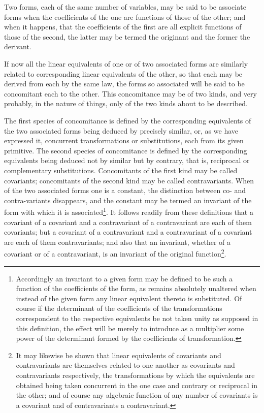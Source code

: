 \documentclass[11pt]{article}
\newcommand{\sourcepage}[1]{\marginpar{\scriptsize p.~#1}}
\begin{document}
{{Two forms, each of the same number of variables, may be said to be associate forms when the coefficients of the one are functions of those of the other; and when it happens, that the coefficients of the first are all explicit functions of those of the second, the latter may be termed the originant and the former the derivant.

If now all the linear equivalents of one or of two associated forms are similarly related to corresponding linear equivalents of the other, so that each may be derived from each by the same law, the forms so associated will be said to be concomitant each to the other. This concomitance may be of two kinds, and very probably, in the nature of things, only of the two kinds about to be described.

\sourcepage{200}
The first species of concomitance is defined by the corresponding equivalents of the two associated forms being deduced by precisely similar, or, as we have expressed it, concurrent transformations or substitutions, each from its given primitive. The second species of concomitance is defined by the corresponding equivalents being deduced not by similar but by contrary, that is, reciprocal or complementary substitutions. Concomitants of the first kind may be called covariants; concomitants of the second kind may be called contravariants. When of the two associated forms one is a constant, the distinction between co- and contra-variants disappears, and the constant may be termed an invariant of the form with which it is associated\footnote{Accordingly an invariant to a given form may be defined to be such a function of the coefficients of the form, as remains absolutely unaltered when instead of the given form any linear equivalent thereto is substituted. Of course if the determinant of the coefficients of the transformations correspondent to the respective equivalents be not taken unity as supposed in this definition, the effect will be merely to introduce as a multiplier some power of the determinant formed by the coefficients of transformation.}. It follows readily from these definitions that a covariant of a covariant and a contravariant of a contravariant are each of them covariants; but a covariant of a contravariant and a contravariant of a covariant are each of them contravariants; and also that an invariant, whether of a covariant or of a contravariant, is an invariant of the original function\footnote{It may likewise be shown that linear equivalents of covariants and contravariants are themselves related to one another as covariants and contravariants respectively, the transformations by which the equivalents are obtained being taken concurrent in the one case and contrary or reciprocal in the other; and of course any algebraic function of any number of covariants is a covariant and of contravariants a contravariant.}.

}}
\end{document}
